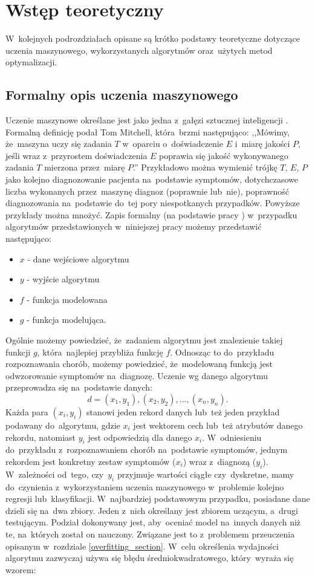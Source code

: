 \section{Wstęp teoretyczny} \label{theory}
W~kolejnych podrozdziałach opisane są krótko podstawy teoretyczne dotyczące uczenia maszynowego, wykorzystanych algorytmów oraz~użytych metod optymalizacji.
\subsection{Formalny opis uczenia maszynowego}
Uczenie maszynowe określane jest jako jedna z~gałęzi sztucznej inteligencji \cite{dnn1}. Formalną definicję podał Tom Mitchell, która~brzmi następująco: ,,Mówimy, że~maszyna uczy się zadania $T$ w~oparciu o~doświadczenie $E$ i~miarę jakości $P$, jeśli wraz z~przyrostem doświadczenia $E$ poprawia się jakość wykonywanego zadania $T$ mierzona przez~miarę $P$.''\cite{mitchel} Przykładowo można wymienić trójkę $T$, $E$, $P$ jako kolejno diagnozowanie pacjenta na~podstawie symptomów, dotychczasowe  liczba wykonanych przez~maszynę diagnoz (poprawnie lub~nie),  poprawność diagnozowania na~podstawie do~tej pory niespotkanych przypadków. Powyższe przykłady można mnożyć. Zapis formalny (na podstawie pracy \cite{formal2}) w~przypadku algorytmów przedstawionych w~niniejszej pracy możemy przedstawić następująco:
\begin{itemize}
\item $x$ - dane wejściowe algorytmu
\item $y$ - wyjście algorytmu
\item $f$ - funkcja modelowana
\item $g$ - funkcja modelująca.
\end{itemize}
Ogólnie możemy powiedzieć, że~zadaniem algorytmu jest znalezienie takiej funkcji $g$, która~najlepiej przybliża funkcję $f$. Odnosząc to do~przykładu rozpoznawania chorób, możemy powiedzieć, że~modelowaną funkcją jest odwzorowanie symptomów na~diagnozę. Uczenie wg danego algorytmu przeprowadza się na~podstawie danych:
\begin{equation}
d = (x_1,y_1), (x_2, y_2), ..., (x_n, y_n).
\end{equation}
Każda para $(x_i, y_i)$ stanowi jeden rekord danych lub~też jeden przykład podawany do~algorytmu, gdzie $x_i$ jest wektorem cech lub~też atrybutów danego rekordu, natomiast $y_i$ jest odpowiedzią dla danego $x_i$. W~odniesieniu do~przykładu z~rozpoznawaniem chorób na~podstawie symptomów, jednym rekordem jest konkretny zestaw symptomów ($x_i$) wraz z~diagnozą ($y_i$). W~zależności od~tego, czy~$y_i$ przyjmuje wartości ciągłe czy~dyskretne, mamy do~czynienia z~wykorzystaniem uczenia maszynowego w~problemie kolejno regresji lub~klasyfikacji. W~najbardziej podstawowym przypadku, posiadane dane dzieli się na~dwa zbiory. Jeden z~nich określany jest zbiorem uczącym, a~drugi testującym. Podział dokonywany jest, aby~oceniać model na~innych danych niż te, na~których został on nauczony. Związane jest to z~problemem przeuczenia opisanym w~rozdziale \ref{overfitting_section}. W~celu określenia wydajności algorytmu zazwyczaj używa się błędu średniokwadratowego, który~wyraża się wzorem:
